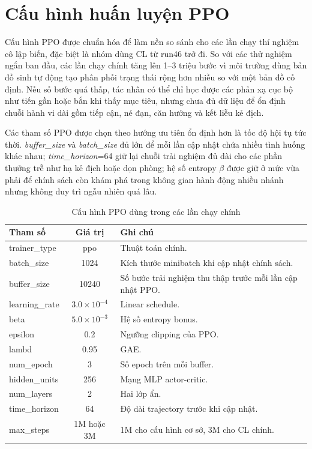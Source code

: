 \section{Cấu hình huấn luyện PPO}

Cấu hình PPO được chuẩn hóa để làm nền so sánh cho các lần chạy thí nghiệm cô lập biến, đặc biệt là nhóm dùng CL từ run46 trở đi. So với các thử nghiệm ngắn ban đầu, các lần chạy chính tăng lên 1--3 triệu bước vì môi trường dùng bản đồ sinh tự động tạo phân phối trạng thái rộng hơn nhiều so với một bản đồ cố định. Nếu số bước quá thấp, tác nhân có thể chỉ học được các phản xạ cục bộ như tiến gần hoặc bắn khi thấy mục tiêu, nhưng chưa đủ dữ liệu để ổn định chuỗi hành vi dài gồm tiếp cận, né đạn, căn hướng và kết liễu kẻ địch.

Các tham số PPO được chọn theo hướng ưu tiên ổn định hơn là tốc độ hội tụ tức thời. \emph{buffer\_size} và \emph{batch\_size} đủ lớn để mỗi lần cập nhật chứa nhiều tình huống khác nhau; \emph{time\_horizon}=64 giữ lại chuỗi trải nghiệm đủ dài cho các phần thưởng trễ như hạ kẻ địch hoặc dọn phòng; hệ số entropy $\beta$ được giữ ở mức vừa phải để chính sách còn khám phá trong không gian hành động nhiều nhánh nhưng không duy trì ngẫu nhiên quá lâu.

\begin{table}[H]
    \centering
    \small
    \caption{Cấu hình PPO dùng trong các lần chạy chính}
    \label{tab:ppo_baseline_config}
    \begin{tabular}{|p{4cm}|c|p{7cm}|}
        \hline
        \textbf{Tham số} & \textbf{Giá trị} & \textbf{Ghi chú} \\
        \hline
        trainer\_type & ppo & Thuật toán chính. \\
        \hline
        batch\_size & 1024 & Kích thước minibatch khi cập nhật chính sách. \\
        \hline
        buffer\_size & 10240 & Số bước trải nghiệm thu thập trước mỗi lần cập nhật PPO. \\
        \hline
        learning\_rate & $3.0 \times 10^{-4}$ & Linear schedule. \\
        \hline
        beta & $5.0 \times 10^{-3}$ & Hệ số entropy bonus. \\
        \hline
        epsilon & 0.2 & Ngưỡng clipping của PPO. \\
        \hline
        lambd & 0.95 & GAE. \\
        \hline
        num\_epoch & 3 & Số epoch trên mỗi buffer. \\
        \hline
        hidden\_units & 256 & Mạng MLP actor-critic. \\
        \hline
        num\_layers & 2 & Hai lớp ẩn. \\
        \hline
        time\_horizon & 64 & Độ dài trajectory trước khi cập nhật. \\
        \hline
        max\_steps & 1M hoặc 3M & 1M cho cấu hình cơ sở, 3M cho CL chính. \\
        \hline
    \end{tabular}
\end{table}

